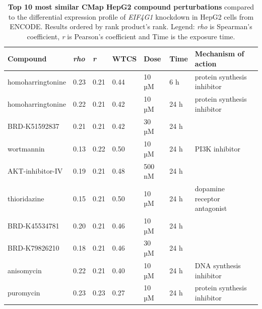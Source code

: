 \begin{table}[!ht]
\centering
\footnotesize
\caption[Top 10 CMap HepG2 compound perturbations]{\textbf{Top 10 most similar CMap HepG2 compound perturbations} compared to the differential expression profile of \emph{EIF4G1} knockdown in HepG2 cells from ENCODE. Results ordered by rank product's rank. Legend: \emph{rho} is Spearman's coefficient, \emph{r} is Pearson's coefficient and Time is the exposure time.}
\label{tab:eif4g1-cmap-compounds}
\begin{tabular}{llllllll}
\toprule
\textbf{Compound}     & \textbf{\emph{rho}} & \textbf{\emph{r}} & \textbf{WTCS} & \textbf{Dose} & \textbf{Time} & \textbf{Mechanism of action} \\
\midrule
homoharringtonine & 0.23                           & 0.21                           & 0.44          & 10 µM         & 6 h                & protein synthesis inhibitor  \\
homoharringtonine & 0.22                           & 0.21                           & 0.42          & 10 µM         & 24 h               & protein synthesis inhibitor  \\
BRD-K51592837     & 0.21                           & 0.21                           & 0.42          & 30 µM         & 24 h               &                              \\
wortmannin        & 0.13                           & 0.22                           & 0.50          & 10 µM         & 24 h               & PI3K inhibitor               \\
AKT-inhibitor-IV  & 0.19                           & 0.21                           & 0.48          & 500 nM        & 24 h               &                              \\
thioridazine      & 0.15                           & 0.21                           & 0.50          & 10 µM         & 24 h               & dopamine receptor antagonist \\
BRD-K45534781     & 0.20                           & 0.21                           & 0.46          & 10 µM         & 24 h               &                              \\
BRD-K79826210     & 0.18                           & 0.21                           & 0.46          & 30 µM         & 24 h               &                              \\
anisomycin        & 0.22                           & 0.21                           & 0.40          & 10 µM         & 24 h               & DNA synthesis inhibitor      \\
puromycin         & 0.23                           & 0.23                           & 0.27          & 10 µM         & 24 h               & protein synthesis inhibitor \\
\bottomrule
\end{tabular}
\end{table}

